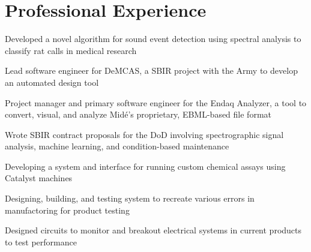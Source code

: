 \documentclass[letterpaper]{deedy-resume} %
\begin{document}
\hfill
%
%
\begin{minipage}[t]{0.66\textwidth} %


\section{Professional Experience}


\vspace{\topsep} %
\begin{tightitemize}
\item Developed a novel algorithm for sound event detection using spectral analysis to classify rat calls in medical research
\item Lead software engineer for DeMCAS, a SBIR project with the Army to develop an automated design tool
\item Project manager and primary software engineer for the Endaq Analyzer, a tool to convert, visual, and analyze Midé's proprietary, EBML-based file format
\item Wrote SBIR contract proposals for the DoD involving spectrographic signal analysis, machine learning, and condition-based maintenance
\end{tightitemize}

\sectionspace %



\begin{tightitemize}
\item Developing a system and interface for running custom chemical assays using Catalyst machines
\item Designing, building, and testing system to recreate various errors in manufactoring for product testing
\item Designed circuits to monitor and breakout electrical systems in current products to test performance
\end{tightitemize}


\end{minipage}
\end{document}
